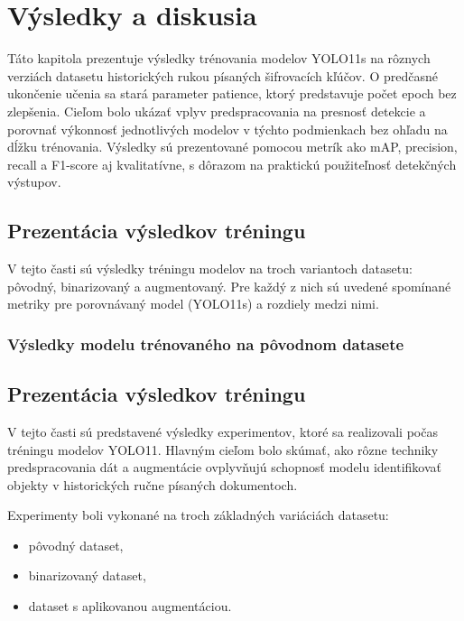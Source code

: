 
\section{Výsledky a diskusia}
Táto kapitola prezentuje výsledky trénovania modelov YOLO11s na rôznych verziách datasetu historických rukou písaných šifrovacích kľúčov. O predčasné ukončenie učenia sa stará parameter patience, ktorý predstavuje počet epoch bez zlepšenia. Cieľom bolo ukázať vplyv predspracovania na presnosť detekcie a porovnať výkonnosť jednotlivých modelov v týchto podmienkach bez ohľadu na dĺžku trénovania. Výsledky sú prezentované pomocou metrík ako mAP, precision, recall a F1-score aj kvalitatívne, s dôrazom na praktickú použiteľnosť detekčných výstupov.
    \subsection{Prezentácia výsledkov tréningu}
    V tejto časti sú výsledky tréningu modelov na troch variantoch datasetu: pôvodný, binarizovaný a augmentovaný. Pre každý z nich sú uvedené spomínané metriky pre porovnávaný model (YOLO11s) a rozdiely medzi nimi.
    \subsubsection{Výsledky modelu trénovaného na pôvodnom datasete}

    \subsection{Prezentácia výsledkov tréningu}

    V tejto časti sú predstavené výsledky experimentov, ktoré sa realizovali počas tréningu modelov YOLO11. Hlavným cieľom bolo skúmať, ako rôzne techniky predspracovania dát a augmentácie ovplyvňujú schopnosť modelu identifikovať objekty v historických ručne písaných dokumentoch.

    Experimenty boli vykonané na troch základných variáciách datasetu:
    \begin{itemize}
        \item pôvodný dataset,
        \item binarizovaný dataset,
        \item dataset s aplikovanou augmentáciou.
    \end{itemize}

